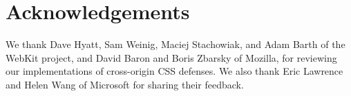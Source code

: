 \documentclass{acm_proc_article-sp}
\begin{document}
\section*{Acknowledgements}

We thank Dave Hyatt, Sam Weinig, Maciej Stachowiak, and Adam Barth of the
WebKit project, and David Baron and Boris Zbarsky of Mozilla, for reviewing
our implementations of cross-origin CSS defenses. We also thank Eric Lawrence
and Helen Wang of Microsoft for sharing their feedback.
 


\end{document}
